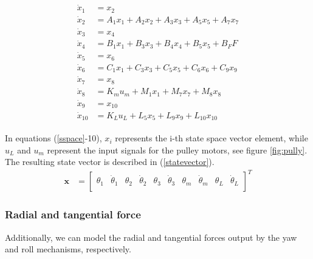 

\begin{gather}\label{sspace}
\begin{align}
\dot{x}_1 &= x_2\\
\dot{x}_2 &= A_1x_1 + A_2x_2 + A_3x_3 + A_5x_5 + A_7x_7\\
\dot{x}_3 &= x_4\\
\dot{x}_4 &= B_1x_1 + B_3x_3 + B_4x_4 + B_5x_5 + B_FF\\
\dot{x}_5 &= x_6\\
\dot{x}_6 &= C_1x_1 + C_3x_3 + C_5x_5 + C_6x_6 + C_9x_9\\
\dot{x}_7 &= x_8\\
\dot{x}_8 &= K_mu_m + M_1x_1 + M_7x_7 + M_8x_8\\
\dot{x}_9 &= x_{10}\\
\dot{x}_{10} &= K_Lu_L + L_5x_5 + L_9x_9 + L_{10}x_{10}
\end{align}
\end{gather}


In equations (\ref{sspace}-10), $x_i$ represents the i-th state space vector element, while $u_L$ and $u_m$ represent the input signals for the pulley motors, see figure \ref{fig:pully}.
The resulting state vector is described in (\ref{statevector}).
\begin{align} \label{statevector}
\mathbf{x} &=
\begin{bmatrix}
\theta_1 &\dot{\theta}_1 &\theta_2 &\dot{\theta}_2 &\theta_3 &\dot{\theta}_3 &\theta_m &\dot{\theta}_m &\theta_L &\dot{\theta}_L \\
\end{bmatrix}^T
\end{align}

\subsubsection{Radial and tangential force}
Additionally, we can model the radial and tangential forces output by the yaw and roll mechanisms, respectively.

